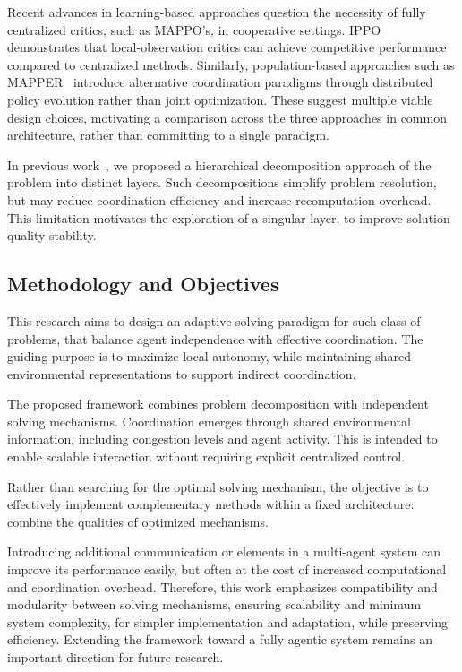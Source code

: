 \documentclass[sigconf]{acmart}
\begin{document}
Recent advances in learning-based approaches question the necessity of fully centralized critics, such as MAPPO's, in cooperative settings. IPPO~\cite{dewitt2020} demonstrates that local-observation critics can achieve competitive performance compared to centralized methods. Similarly, population-based approaches such as MAPPER~\cite{liu2020} introduce alternative coordination paradigms through distributed policy evolution rather than joint optimization. These suggest multiple viable design choices, motivating a comparison across the three approaches in common architecture, rather than committing to a single paradigm.

In previous work~\cite{crepin2025}, we proposed a hierarchical decomposition approach of the problem into distinct layers. Such decompositions simplify problem resolution, but may reduce coordination efficiency and increase recomputation overhead. This limitation motivates the exploration of a singular layer, to improve solution quality stability.

\subsection{Methodology and Objectives}

This research aims to design an adaptive solving paradigm for such class of problems, that balance agent independence with effective coordination. The guiding purpose is to maximize local autonomy, while maintaining shared environmental representations to support indirect coordination.

The proposed framework combines problem decomposition with independent solving mechanisms. Coordination emerges through shared environmental information, including congestion levels and agent activity. This is intended to enable scalable interaction without requiring explicit centralized control.

Rather than searching for the optimal solving mechanism, the objective is to effectively implement complementary methods within a fixed architecture: combine the qualities of optimized mechanisms.

Introducing additional communication or elements in a multi-agent system can improve its performance easily, but often at the cost of increased computational and coordination overhead. Therefore, this work emphasizes compatibility and modularity between solving mechanisms, ensuring scalability and minimum system complexity, for simpler implementation and adaptation, while preserving efficiency. Extending the framework toward a fully agentic system remains an important direction for future research.
\end{document}
